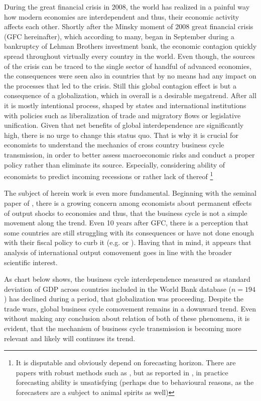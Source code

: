 \documentclass{article}
\begin{document}
During the great financial crisis in 2008, the world has realized in a painful way how modern economies are interdependent and thus, their economic activity affects each other. Shortly after the Minsky moment of 2008 great financial crisis (GFC hereinafter), which according to many, began in September during a bankruptcy of Lehman Brothers investment bank, the economic contagion quickly spread throughout virtually every country in the world. Even though, the sources of the crisis can be traced to the single sector of handful of advanced economies, the consequences were seen also in countries that by no means had any impact on the processes that led to the crisis. Still this global contagion effect is but a consequence of a globalization, which in overall is a desirable megatrend. After all it is mostly intentional process, shaped by states and international institutions with policies such as liberalization of trade and migratory flows or legislative unification. Given that net benefits of global interdependence are significantly high, there is no urge to change this status quo. That is why it is crucial for economists to understand the mechanics of cross country business cycle transmission, in order to better assess macroeconomic risks and conduct a proper policy rather than eliminate its source. Especially, considering ability of economists to predict incoming recessions or rather lack of thereof \footnote[1]{It is disputable and obviously depend on forecasting horizon. There are papers with robust methods such as \cite{greenwood}, but as reported in \cite{kenny}, in practice forecasting ability is unsatisfying (perhaps due to behavioural reasons, as the forecasters are a subject to animal spirits as well)}

The subject of herein work is even more fundamental. Beginning with the seminal paper of \cite{nelson_plosser}, there is a growing concern among economists about permanent effects of output shocks to economies and thus, that the business cycle is not a simple movement along the trend. Even 10 years after GFC, there is a perception that some countries are still struggling with its consequences or have not done enough with their fiscal policy to curb it (e.g. \cite{IMF} or \cite{house}). Having that in mind, it appears that analysis of international output comovement goes in line with the broader scientific interest.

As chart below shows, the business cycle interdependence measured as standard deviation of GDP across countries included in the World Bank database ($n = 194$) has declined during a period, that globalization was proceeding. Despite the trade wars, global business cycle comovement remains in a downward trend. Even without making any conclusion about relation of both of these phenomena, it is evident, that the mechanism of business cycle transmission is becoming more relevant and likely will continues its trend. 
\end{document}

